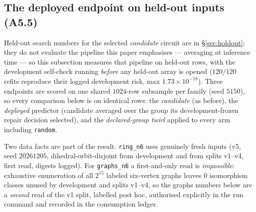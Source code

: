 \documentclass[11pt]{article}
\begin{document}
\subsection{The deployed endpoint on held-out inputs (A5.5)}
\label{sec:deployed}

Held-out search numbers for the selected \emph{candidate} circuit are in \S\ref{sec:holdout};
they do not evaluate the pipeline this paper emphasises --- averaging at inference time --- so
this subsection measures that pipeline on held-out rows, with the development self-check running
\emph{before} any held-out array is opened ($120/120$ refits reproduce their logged
development risk, max $1.73\times10^{-18}$). Three endpoints are scored on one shared
$1024$-row subsample per family (seed $5150$), so every comparison below is on identical rows:
the \emph{candidate} (as before), the \emph{deployed} predictor (candidate averaged over the
group its development-frozen repair decision selected), and the \emph{declared-group twirl}
applied to every arm including \texttt{random}.

Two data facts are part of the result. \texttt{ring\_n6} uses genuinely fresh inputs
(v5, seed $20261205$, dihedral-orbit-disjoint from development and from splits v1--v4, first
read, digests logged). For \texttt{graphs\_n6} a first-and-only read is \emph{impossible}:
exhaustive enumeration of all $2^{15}$ labeled six-vertex graphs leaves $0$ isomorphism
classes unused by development and splits v1--v4, so the graphs numbers below are a
\emph{second} read of the v1 split, labelled post hoc, authorised explicitly in the run
command and recorded in the consumption ledger.
\end{document}
